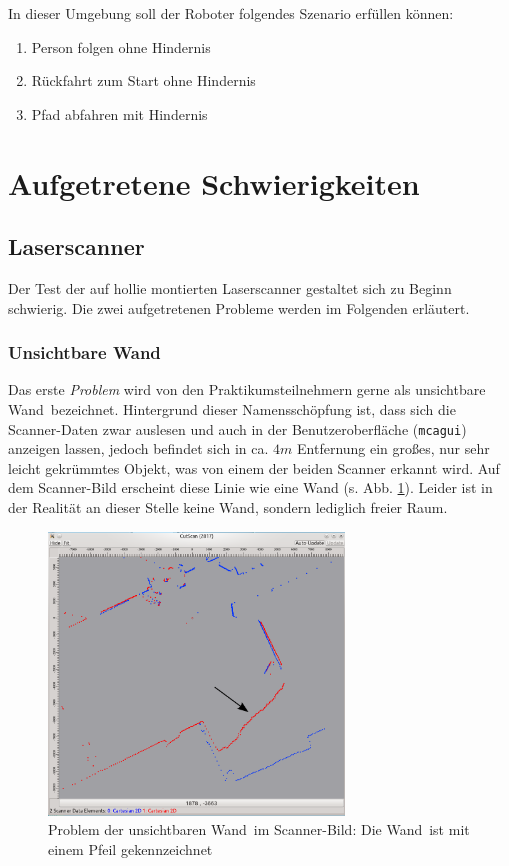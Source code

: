 In dieser Umgebung soll der Roboter folgendes Szenario erfüllen können:
\begin{enumerate}
  \item Person folgen ohne Hindernis
  \item Rückfahrt zum Start ohne Hindernis
  \item Pfad abfahren mit Hindernis
\end{enumerate}



\section{Aufgetretene Schwierigkeiten}

\subsection{Laserscanner}
\label{test_schwierigkeiten_laserscanner_sec}

Der Test der auf \gls{hollie} montierten Laserscanner gestaltet sich zu Beginn schwierig.
Die zwei aufgetretenen Probleme werden im Folgenden erläutert.

\subsubsection{\glqq Unsichtbare Wand\grqq}

Das erste \emph{Problem} wird von den Praktikumsteilnehmern gerne als \glqq unsichtbare Wand\grqq\ bezeichnet.
Hintergrund dieser Namensschöpfung ist, dass sich die Scanner-Daten zwar auslesen und auch in der Benutzeroberfläche (\lstinline{mcagui}) anzeigen lassen, jedoch befindet sich in ca. $4m$ Entfernung ein großes, nur sehr leicht gekrümmtes Objekt, was von einem der beiden Scanner erkannt wird.
Auf dem Scanner-Bild erscheint diese Linie wie eine Wand (s. Abb. \ref{fig:scanner_problem}).
Leider ist in der Realität an dieser Stelle keine Wand, sondern lediglich freier Raum.

\begin{figure}[h]
	\centering
	\includegraphics[width=0.7\textwidth]{graphics/cutscan_fehler}
	\caption[\glqq Unsichtbare Wand\grqq]{Problem der \glqq unsichtbaren Wand\grqq\ im Scanner-Bild: Die \glqq Wand\grqq\ ist mit einem Pfeil gekennzeichnet}
	\label{fig:scanner_problem}
\end{figure}

